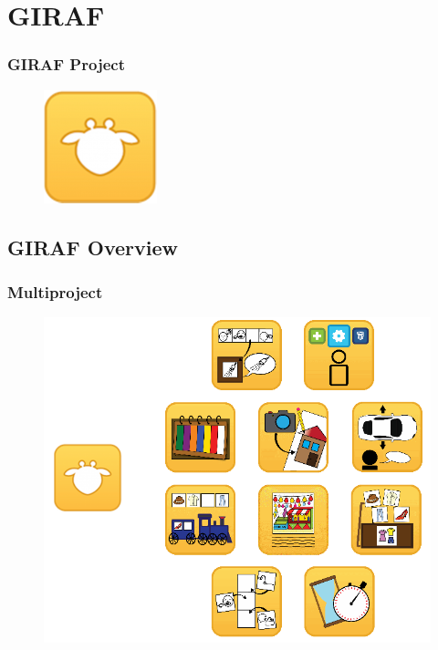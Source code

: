 \section{GIRAF}
\begin{frame}
	\frametitle{GIRAF Project}
	\begin{figure}[H]
		\centering
		\includegraphics[width= 0.4 \textwidth]{pictures/giraf_icon.png}
	\end{figure}
\end{frame}

\subsection{GIRAF Overview}

\begin{frame}
  \begin{center}
	\frametitle{Multiproject}
	\begin{figure}[H]
		\centering
		\includegraphics[width= 0.8 \textwidth]{pictures/ProjectIcons.png}
	\end{figure}
  \end{center}
\end{frame}

